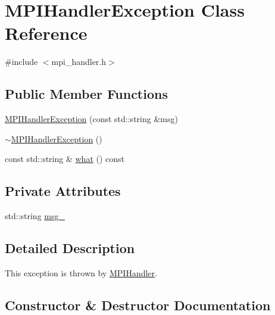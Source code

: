 \hypertarget{classMPIHandlerException}{}\section{M\+P\+I\+Handler\+Exception Class Reference}
\label{classMPIHandlerException}


{\ttfamily \#include $<$mpi\+\_\+handler.\+h$>$}

\subsection*{Public Member Functions}
\begin{DoxyCompactItemize}
\item 
\hyperlink{classMPIHandlerException_a526eac52395f5b0fc29233f94670f423}{M\+P\+I\+Handler\+Exception} (const std\+::string \&msg)
\item 
\hyperlink{classMPIHandlerException_a881e9c7ccdfe83d2d4d2db10513f74e1}{$\sim$\+M\+P\+I\+Handler\+Exception} ()
\item 
const std\+::string \& \hyperlink{classMPIHandlerException_ab46cc546f286d995252b89e73e39eb89}{what} () const 
\end{DoxyCompactItemize}
\subsection*{Private Attributes}
\begin{DoxyCompactItemize}
\item 
std\+::string \hyperlink{classMPIHandlerException_ac42d97ce539575b3eece7759cddf763e}{msg\+\_\+}
\end{DoxyCompactItemize}


\subsection{Detailed Description}
This exception is thrown by \hyperlink{classMPIHandler}{M\+P\+I\+Handler}. 

\subsection{Constructor \& Destructor Documentation}
\hypertarget{classMPIHandlerException_a526eac52395f5b0fc29233f94670f423}{}
